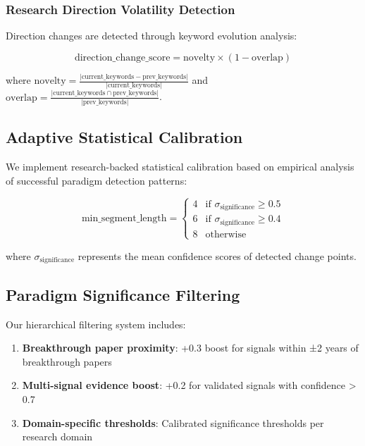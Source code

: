 \documentclass[conference]{IEEEtran}
\begin{document}
\subsubsection{Research Direction Volatility Detection}

Direction changes are detected through keyword evolution analysis:

\begin{equation}
\text{direction\_change\_score} = \text{novelty} \times (1 - \text{overlap})
\end{equation}

where $\text{novelty} = \frac{|\text{current\_keywords} - \text{prev\_keywords}|}{|\text{current\_keywords}|}$ and $\text{overlap} = \frac{|\text{current\_keywords} \cap \text{prev\_keywords}|}{|\text{prev\_keywords}|}$.

\subsection{Adaptive Statistical Calibration}

We implement research-backed statistical calibration based on empirical analysis of successful paradigm detection patterns:

\begin{equation}
\text{min\_segment\_length} = \begin{cases}
4 & \text{if } \sigma_{\text{significance}} \geq 0.5 \\
6 & \text{if } \sigma_{\text{significance}} \geq 0.4 \\
8 & \text{otherwise}
\end{cases}
\end{equation}

where $\sigma_{\text{significance}}$ represents the mean confidence scores of detected change points.

\subsection{Paradigm Significance Filtering}

Our hierarchical filtering system includes:

\begin{enumerate}
\item \textbf{Breakthrough paper proximity}: +0.3 boost for signals within ±2 years of breakthrough papers
\item \textbf{Multi-signal evidence boost}: +0.2 for validated signals with confidence > 0.7
\item \textbf{Domain-specific thresholds}: Calibrated significance thresholds per research domain
\end{enumerate}
\end{document}
